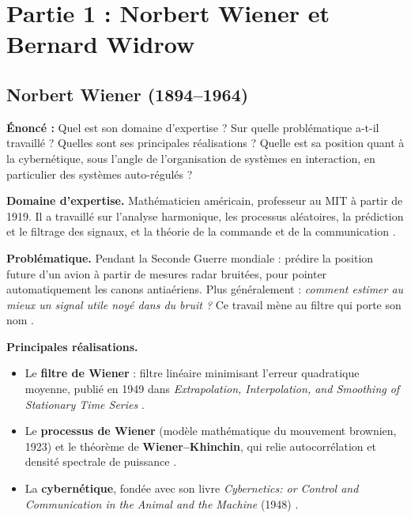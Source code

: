\section{Partie 1 : Norbert Wiener et Bernard Widrow}

\subsection{Norbert Wiener (1894--1964)}

\begin{enonce}
\textbf{Énoncé :} Quel est son domaine d'expertise ? Sur quelle problématique a-t-il travaillé ? Quelles sont ses principales réalisations ? Quelle est sa position quant à la cybernétique, sous l'angle de l'organisation de systèmes en interaction, en particulier des systèmes auto-régulés ?
\end{enonce}

\textbf{Domaine d'expertise.} Mathématicien américain, professeur au MIT à partir de 1919. Il a travaillé sur l'analyse harmonique, les processus aléatoires, la prédiction et le filtrage des signaux, et la théorie de la commande et de la communication \cite{ethw_wiener}.

\textbf{Problématique.} Pendant la Seconde Guerre mondiale : prédire la position future d'un avion à partir de mesures radar bruitées, pour pointer automatiquement les canons antiaériens. Plus généralement : \emph{comment estimer au mieux un signal utile noyé dans du bruit ?} Ce travail mène au filtre qui porte son nom \cite{wiki_wiener}.

\textbf{Principales réalisations.}
\begin{itemize}
  \item Le \textbf{filtre de Wiener} : filtre linéaire minimisant l'erreur quadratique moyenne, publié en 1949 dans \emph{Extrapolation, Interpolation, and Smoothing of Stationary Time Series} \cite{wiener1949}.
  \item Le \textbf{processus de Wiener} (modèle mathématique du mouvement brownien, 1923) et le théorème de \textbf{Wiener--Khinchin}, qui relie autocorrélation et densité spectrale de puissance \cite{ethw_wiener}.
  \item La \textbf{cybernétique}, fondée avec son livre \emph{Cybernetics: or Control and Communication in the Animal and the Machine} (1948) \cite{wiener1948}.
\end{itemize}


